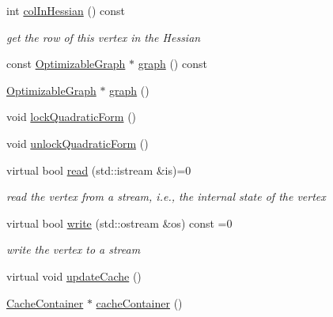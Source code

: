 \begin{DoxyCompactItemize}
int \hyperlink{classg2o_1_1OptimizableGraph_1_1Vertex_a9559c391b2962de131045a90815a9b5a}{col\+In\+Hessian} () const 
\begin{DoxyCompactList}\small\item\em get the row of this vertex in the Hessian \end{DoxyCompactList}\item 
const \hyperlink{structg2o_1_1OptimizableGraph}{Optimizable\+Graph} $\ast$ \hyperlink{classg2o_1_1OptimizableGraph_1_1Vertex_a6dd9a3f7fd07016cdbe791e21c6d87df}{graph} () const 
\item 
\hyperlink{structg2o_1_1OptimizableGraph}{Optimizable\+Graph} $\ast$ \hyperlink{classg2o_1_1OptimizableGraph_1_1Vertex_a3f845c6f0ba9a87ab15caaddba5a4037}{graph} ()
\item 
void \hyperlink{classg2o_1_1OptimizableGraph_1_1Vertex_a2eb3dbe08fd20ca8feeeaecc63ce240c}{lock\+Quadratic\+Form} ()
\item 
void \hyperlink{classg2o_1_1OptimizableGraph_1_1Vertex_a5badd602625433ee1ce8e2aa7bb3b2ac}{unlock\+Quadratic\+Form} ()
\item 
virtual bool \hyperlink{classg2o_1_1OptimizableGraph_1_1Vertex_a356c40d33c3f1e07afa938dfb4870230}{read} (std\+::istream \&is)=0
\begin{DoxyCompactList}\small\item\em read the vertex from a stream, i.\+e., the internal state of the vertex \end{DoxyCompactList}\item 
virtual bool \hyperlink{classg2o_1_1OptimizableGraph_1_1Vertex_a4cac277db656fddb5f844d9009d601eb}{write} (std\+::ostream \&os) const =0
\begin{DoxyCompactList}\small\item\em write the vertex to a stream \end{DoxyCompactList}\item 
virtual void \hyperlink{classg2o_1_1OptimizableGraph_1_1Vertex_ab5972c8ba6834c4dcb8a2319e9bf3070}{update\+Cache} ()
\item 
\hyperlink{classg2o_1_1CacheContainer}{Cache\+Container} $\ast$ \hyperlink{classg2o_1_1OptimizableGraph_1_1Vertex_ab381120a2c00fc8ae90e5c298dfbb967}{cache\+Container} ()
\end{DoxyCompactItemize}
